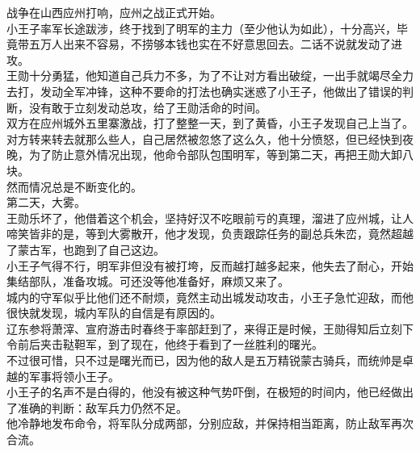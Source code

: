 \begin{multicols}{\theparacolNo}
战争在山西应州打响，应州之战正式开始。\\

小王子率军长途跋涉，终于找到了明军的主力（至少他认为如此），十分高兴，毕竟带五万人出来不容易，不捞够本钱也实在不好意思回去。二话不说就发动了进攻。\\

王勋十分勇猛，他知道自己兵力不多，为了不让对方看出破绽，一出手就竭尽全力去打，发动全军冲锋，这种不要命的打法也确实迷惑了小王子，他做出了错误的判断，没有敢于立刻发动总攻，给了王勋活命的时间。\\

双方在应州城外五里寨激战，打了整整一天，到了黄昏，小王子发现自己上当了。\\

对方转来转去就那么些人，自己居然被忽悠了这么久，他十分愤怒，但已经快到夜晚，为了防止意外情况出现，他命令部队包围明军，等到第二天，再把王勋大卸八块。\\

然而情况总是不断变化的。\\

第二天，大雾。\\

王勋乐坏了，他借着这个机会，坚持好汉不吃眼前亏的真理，溜进了应州城，让人啼笑皆非的是，等到大雾散开，他才发现，负责跟踪任务的副总兵朱峦，竟然超越了蒙古军，也跑到了自己这边。\\

小王子气得不行，明军非但没有被打垮，反而越打越多起来，他失去了耐心，开始集结部队，准备攻城。可还没等他准备好，麻烦又来了。\\

城内的守军似乎比他们还不耐烦，竟然主动出城发动攻击，小王子急忙迎敌，而他很快就发现，城内军队的自信是有原因的。\\

辽东参将萧滓、宣府游击时春终于率部赶到了，来得正是时候，王勋得知后立刻下令前后夹击鞑靼军，到了现在，他终于看到了一丝胜利的曙光。\\

不过很可惜，只不过是曙光而已，因为他的敌人是五万精锐蒙古骑兵，而统帅是卓越的军事将领小王子。\\

小王子的名声不是白得的，他没有被这种气势吓倒，在极短的时间内，他已经做出了准确的判断：敌军兵力仍然不足。\\

他冷静地发布命令，将军队分成两部，分别应敌，并保持相当距离，防止敌军再次合流。\\


\end{multicols}

